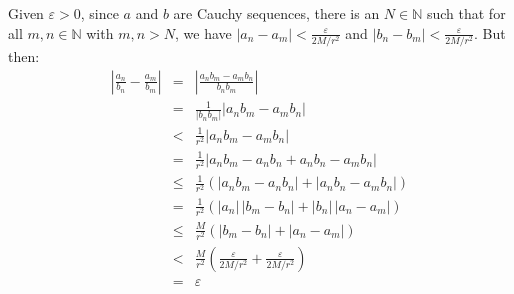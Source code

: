 \documentclass{article}
\begin{document}
    Given $\varepsilon>0$, since $a$ and $b$ are Cauchy sequences, there is
    an $N\in\mathbb{N}$ such that for all
    $m,n\in\mathbb{N}$ with $m,n>N$, we have
    $|a_{n}-a_{m}|<\frac{\varepsilon}{2M/r^{2}}$ and
    $|b_{n}-b_{m}|<\frac{\varepsilon}{2M/r^{2}}$. But then:
    \begin{equation}
        \begin{array}{rcl}
            \displaystyle
            \left|
                \frac{a_{n}}{b_{n}}
                -
                \frac{a_{m}}{b_{m}}
            \right|
            \!\!
            &=&
            \!\!
            \displaystyle
            \left|
                \frac{a_{n}b_{m}-a_{m}b_{n}}{b_{n}b_{m}}
            \right|\\[1.5em]
            \!\!
            &=&
            \!\!
            \displaystyle
            \frac{1}{|b_{n}b_{m}|}
            \left|
                a_{n}b_{m}
                -
                a_{m}b_{n}
            \right|\\[1.5em]
            \!\!
            &<&
            \!\!
            \displaystyle
            \frac{1}{r^{2}}
            \left|
                a_{n}b_{m}
                -
                a_{m}b_{n}
            \right|\\[1.5em]
            \!\!
            &=&
            \!\!
            \displaystyle
            \frac{1}{r^{2}}
            \left|
                a_{n}b_{m}-a_{n}b_{n}+a_{n}b_{n}-a_{m}b_{n}
            \right|\\[1.5em]
            \!\!
            &\leq&
            \!\!
            \displaystyle
            \frac{1}{r^{2}}\left(
                \left|
                    a_{n}b_{m}-a_{n}b_{n}
                \right|
                +
                \left|
                    a_{n}b_{n}-a_{m}b_{n}
                \right|
            \right)\\[1.5em]
            \!\!
            &=&
            \!\!
            \displaystyle
            \frac{1}{r^{2}}\left(
                \left|
                    a_{n}
                \right|\,
                \left|
                    b_{m}-b_{n}
                \right|
                +
                \left|
                    b_{n}
                \right|\,
                \left|
                    a_{n}-a_{m}
                \right|
            \right)\\[1.5em]
            \!\!
            &\leq&
            \!\!
            \displaystyle
            \frac{M}{r^{2}}\left(
                \left|
                    b_{m}-b_{n}
                \right|
                +
                \left|
                    a_{n}-a_{m}
                \right|
            \right)\\[1.5em]
            \!\!
            &<&
            \!\!
            \displaystyle
            \frac{M}{r^{2}}\left(
                \frac{\varepsilon}{2M/r^{2}}
                +
                \frac{\varepsilon}{2M/r^{2}}
            \right)\\[1.5em]
            \!\!
            &=&
            \!\!
            \displaystyle
            \varepsilon
        \end{array}
    \end{equation}
\end{document}
